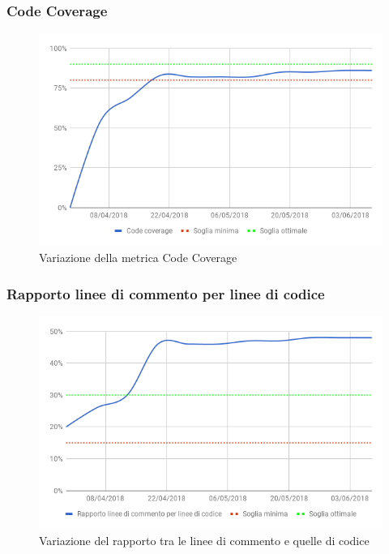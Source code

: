 		\subsubsection{Code Coverage}
		
		\begin{figure}[H]{\textwidth}
  			\centering
  			\includegraphics[width=1\linewidth]{./img/Risultati/CodeCoverage.png}
	  		\caption[Variazione Code Coverage]{Variazione della metrica Code Coverage}
		\end{figure}
		
		\subsubsection{Rapporto linee di commento per linee di codice}
		
		\begin{figure}[H]{\textwidth}
  			\centering
  			\includegraphics[width=1\linewidth]{./img/Risultati/RapportoCommentoCodice.png}
	  		\caption[Variazione rapporto linee di commento per linee di codice]{Variazione del rapporto tra le linee di commento e quelle di codice}
		\end{figure}
		
